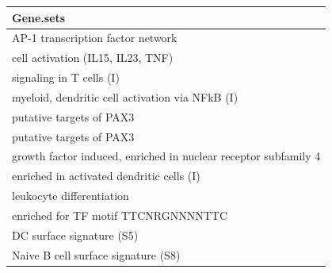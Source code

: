 \begin{tabular}{l}
  \hline
Gene.sets \\ 
  \hline
AP-1 transcription factor network \\ 
  cell activation (IL15, IL23, TNF) \\ 
  signaling in T cells (I) \\ 
  myeloid, dendritic cell activation via NFkB (I) \\ 
  putative targets of PAX3 \\ 
  putative targets of PAX3 \\ 
  growth factor induced, enriched in nuclear receptor subfamily 4 \\ 
  enriched in activated dendritic cells (I) \\ 
  leukocyte differentiation \\ 
  enriched for TF motif TTCNRGNNNNTTC \\ 
  DC surface signature (S5) \\ 
  Naive B cell surface signature (S8) \\ 
   \hline
\end{tabular}
